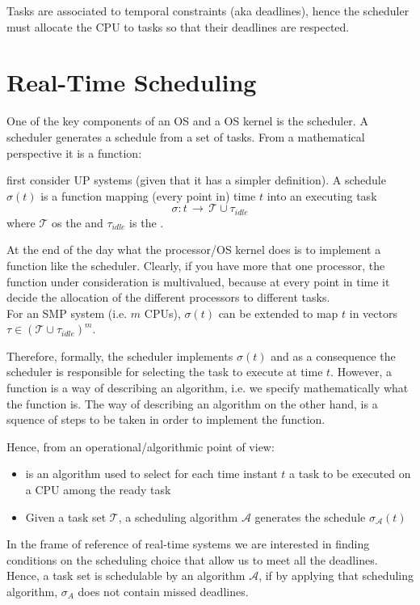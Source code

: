 Tasks are associated to temporal constraints (aka deadlines), hence the scheduler must allocate the CPU to tasks so that their deadlines are respected.

\section{Real-Time Scheduling}

One of the key components of an OS and a OS kernel is the scheduler.
A scheduler generates a schedule from a set of tasks. From a mathematical perspective it is a function:

first consider UP systems (given that it has a simpler definition).
A schedule $\sigma(t)$ is a function mapping (every point in) time $t$ into an executing task
\[\sigma : t\,\to\, \mathcal{T} \cup \tau_{idle}\]
where $\mathcal{T}$ os the  and $\tau_{idle}$ is the .

At the end of the day what the processor/OS kernel does is to implement a function like the scheduler. Clearly, if you have more that one processor, the function under consideration is multivalued, because at every point in time it decide the allocation of the different processors to different tasks.\\
For an SMP system (i.e. $m$ CPUs), $\sigma(t)$ can be extended to map $t$ in vectors $\tau \in (\mathcal{T}\cup \tau_{idle})^m$.

Therefore, formally, the scheduler implements $\sigma(t)$ and as a consequence the scheduler is responsible for selecting the task to execute at time $t$. However, a function is a  way of describing an algorithm, i.e. we specify mathematically what the function is. The  way of describing an algorithm on the other hand, is a squence of steps to be taken in order to implement the function.
 
Hence, from an operational/algorithmic point of view:
\begin{itemize}
\item {} is an algorithm used to select for each time instant $t$ a task to be executed on a CPU among the ready task
\item Given a task set $\mathcal{T}$, a scheduling algorithm $\mathcal{A}$ generates the schedule $\sigma_{\mathcal{A}}(t)$
\end{itemize} 

In the frame of reference of real-time systems we are interested in finding conditions on the scheduling choice that allow us to meet all the deadlines. Hence, a task set is schedulable by an algorithm $\mathcal{A}$, if by applying that scheduling algorithm, $\sigma_{A}$ does not contain missed deadlines. 

